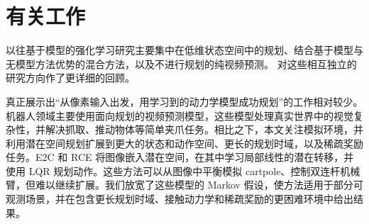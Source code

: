\section{有关工作}
\label{related_work}

以往基于模型的强化学习研究主要集中在低维状态空间中的规划\linebreak \citep{gal2016deeppilco,higuera2018synthesizing,henaff2018planbybackprop,chua2018pets}、结合基于模型与无模型方法优势的混合方法\citep{kalweit2017blending,nagabandi2017mbmf,weber2017i2a,kurutach2018modeltrpo,buckman2018steve,ha2018worldmodels,wayne2018merlin,igl2018dvrl,srinivas2018upn}，以及不进行规划的纯视频预测\citep{oh2015atari,krishnan2015deepkalman,karl2016dvbf,chiappa2017recurrent,babaeizadeh2017sv2p,gemici2017temporalmemory,denton2018stochastic,buesing2018dssm,doerr2018prssm,gregor2018tdvae}。 对这些相互独立的研究方向作了更详细的回顾。

真正展示出“从像素输入出发，用学习到的动力学模型成功规划”的工作相对较少。机器人领域主要使用面向规划的视频预测模型\citep{agrawal2016poking,finn2017foresight,ebert2018foresight,zhang2018solar}，这些模型处理真实世界中的视觉复杂性，并解决抓取、推动物体等简单夹爪任务。相比之下，本文关注模拟环境，并利用潜在空间规划扩展到更大的状态和动作空间、更长的规划时域，以及稀疏奖励任务。E2C \citep{watter2015e2c} 和 RCE \citep{banijamali2017rce} 将图像嵌入潜在空间，在其中学习局部线性的潜在转移，并使用 LQR 规划动作。这些方法可以从图像中平衡模拟 cartpole、控制双连杆机械臂，但难以继续扩展。我们放宽了这些模型的 Markov 假设，使方法适用于部分可观测场景，并在包含更长规划时域、接触动力学和稀疏奖励的更困难环境中给出结果。
